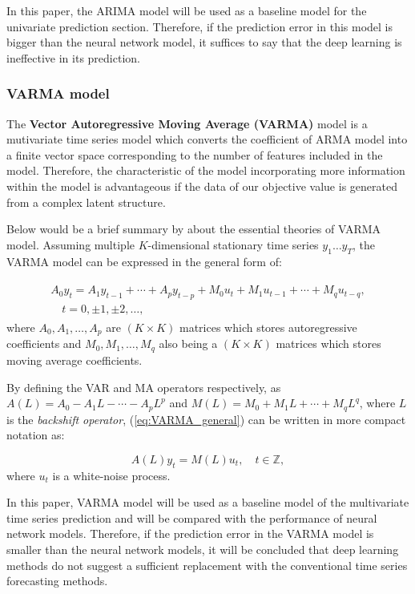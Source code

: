 In this paper, the ARIMA model will be used as a baseline model for the univariate prediction section. Therefore, if the prediction error in this model is bigger than the neural network model, it suffices to say that the deep learning is ineffective in its prediction. 

\subsubsection{VARMA model}
The \textbf{Vector Autoregressive Moving Average (VARMA)} model is a mutivariate time series model which converts the coefficient of ARMA model into a finite vector space corresponding to the number of features included in the model. Therefore, the characteristic of the model incorporating more information within the model is advantageous if the data of our objective value is generated from a complex latent structure. 

Below would be a brief summary by \citet{VARMA} about the essential theories of VARMA model. Assuming multiple $K$-dimensional stationary time series $y_{1}\ldots y_{T}$, the VARMA model can be expressed in the general form of:

\begin{gather}
\begin{array}{l}\label{eq:VARMA_general}
    A_{0} y_{t}=A_{1} y_{t-1}+\cdots+A_{p} y_{t-p}+M_{0} u_{t}+M_{1} u_{t-1}+\cdots+M_{q} u_{t-q}, \\
    \quad t=0, \pm 1, \pm 2, \ldots,
\end{array}
\end{gather}
where $A_{0}, A_{1}, \ldots, A_{p}$ are $(K \times K)$ matrices which stores autoregressive coefficients and $M_{0}, M_{1}, \ldots, M_{q}$ also being a $(K \times K)$ matrices which stores moving average coefficients. 

\noindent By defining the VAR and MA operators respectively, as $A(L)=A_{0}-A_{1} L-\cdots-A_{p} L^{p}$ and $M(L)=M_{0}+M_{1} L+\cdots+M_{q} L^{q}$, where $L$ is the \textit{backshift operator},  (\ref{eq:VARMA_general}) can be written in more compact notation as:

\begin{equation}\label{VARMA_abbr}
    A(L) y_{t}=M(L) u_{t}, \quad t \in \mathbb{Z},
\end{equation}
where $u_{t}$ is a white-noise process. 

In this paper, VARMA model will be used as a baseline model of the multivariate time series prediction and will be compared with the performance of neural network models. Therefore, if the prediction error in the VARMA model is smaller than the neural network models, it will be concluded that deep learning methods do not suggest a sufficient replacement with the conventional time series forecasting methods. 

